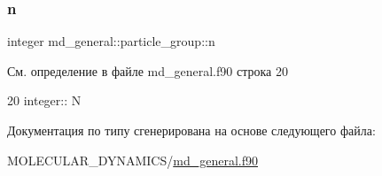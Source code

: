 \subsubsection{\texorpdfstring{n}{n}}
{\footnotesize\ttfamily integer md\+\_\+general\+::particle\+\_\+group\+::n}



См. определение в файле md\+\_\+general.\+f90 строка 20


\begin{DoxyCode}
20     \textcolor{keywordtype}{integer}:: N
\end{DoxyCode}


Документация по типу сгенерирована на основе следующего файла\+:\begin{DoxyCompactItemize}
\item 
M\+O\+L\+E\+C\+U\+L\+A\+R\+\_\+\+D\+Y\+N\+A\+M\+I\+C\+S/\mbox{\hyperlink{md__general_8f90}{md\+\_\+general.\+f90}}\end{DoxyCompactItemize}

